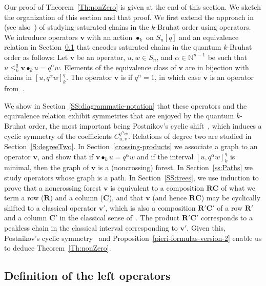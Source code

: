 \documentclass[12pt,oneside,reqno]{amsart}
\theoremstyle{definition}
\numberwithin{equation}{section}
\newcommand{\NN}{{\mathbb N}}
\newcommand{\qv}{{\mathbf v}}
\DeclareMathOperator{\kactionop}{{\scriptstyle \bullet}}
\newcommand{\kaction}[1][k]{\kactionop_{#1}}
\newcommand{\defcolor}[1]{{\color{RoyalBlue}#1}}
\newcommand{\demph}[1]{\defcolor{{\sl #1}}}
\def\R{\mathbf{R}}
\def\C{\mathbf{C}}
\begin{document}
Our proof of Theorem~\ref{Th:nonZero} is given at the end of this section.
We sketch the organization of this section and that proof.
We first extend the approach in~\cite{BS-Monoid} (see also~\cite{Benedetti_Bergeron}) of studying saturated chains in the
$k$-Bruhat order using operators.
We introduce operators $\qv$ with an action $\kaction$ on $S_{n}[q]$ and an equivalence relation in Section~\ref{SS:monoid} that encodes
saturated chains in the quantum $k$-Bruhat order as follows:
Let $\qv$ be an operator, $u,w\in S_n$, and $\alpha\in\NN^{n-1}$ be such that $u\leq^q_k \qv\kaction u = q^\alpha w$.
Elements of the equivalence class of $\qv$ are in bijection with chains in $[u,q^\alpha w]^q_k$.
The operator $\qv$ is \demph{classical} if $q^\alpha=1$, in which case $\qv$ is an operator from~\cite{BS-Monoid}.

We show in Section~\ref{SS:diagrammatic-notation} that these operators and the equivalence relation exhibit symmetries that
are enjoyed by the quantum $k$-Bruhat order, the most important being Postnikov's cyclic shift~\cite{Postnikov_symmetry},
which induces a cyclic symmetry of the coefficients $C^{q^\alpha w}_{u,v}$.
Relations of degree two are studied in Section~\ref{S:degreeTwo}.
In Section~\ref{crossing-products} we associate a graph to an operator $\qv$, and show that if
$\qv\kaction u=q^\alpha w$ and if the interval $[u,q^\alpha w]_k^q$ is minimal, then the graph of $\qv$ is a (noncrossing) forest.
In Section~\ref{ss:Paths} we study operators whose graph is a path.
In Section~\ref{SS:trees}, 
we use induction to prove that a noncrossing forest $\qv$ is equivalent to a composition $\R\C$ of what we term a row ($\R$) and
a column ($\C$), and that $\qv$ (and hence $\R\C$) may be cyclically shifted to a classical operator $\qv'$, which is also
a composition $\R'\C'$ of a row $\R'$ and a column $\C'$ in the classical sense of~\cite{Benedetti_Bergeron}.
The product $\R'\C'$ corresponds to a peakless chain in the classical interval corresponding to $\qv'$.
Given this, Postnikov's cyclic symmetry~\cite[Thm.~4]{Postnikov_symmetry} and
Proposition~\ref{pieri-formulas-version-2} enable us to deduce Theorem~\ref{Th:nonZero}.

\subsection{Definition of the left operators}
\label{SS:monoid}
\end{document}
